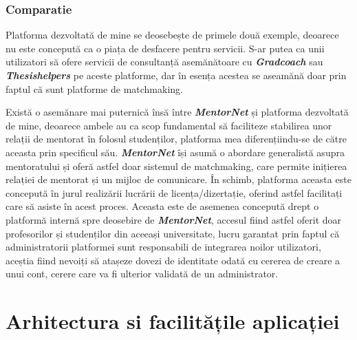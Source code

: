 \documentclass[12pt,a4paper,hidelinks]{report}
\theoremstyle{definition}
\theoremstyle{remark}
\begin{document}
\subsection{Comparatie}
Platforma dezvoltată de mine se deosebește de primele două exemple, deoarece nu este concepută ca o piața de desfacere pentru servicii. S-ar putea ca unii utilizatori să ofere servicii de consultanță asemănătoare cu \textbf{\textit{Gradcoach}} sau \textbf{\textit{Thesishelpers}} pe aceste platforme, dar în esența acestea se aseamănă doar prin faptul că sunt platforme de matchmaking.

Există o asemănare mai puternică însă între \textbf{\textit{MentorNet}} și platforma dezvoltată de mine, deoarece ambele au ca scop fundamental să faciliteze stabilirea unor relații de mentorat în folosul studenților, platforma mea diferențiindu-se de către aceasta prin specificul său. \textbf{\textit{MentorNet}} își asumă o abordare generalistă asupra mentoratului și oferă astfel doar sistemul de matchmaking, care permite inițierea relației de mentorat și un mijloc de comunicare. În schimb, platforma aceasta este concepută în jurul realizării lucrării de licența/dizertație, oferind astfel facilitați care să asiste în acest proces. Aceasta este de asemenea concepută drept o platformă internă spre deosebire de \textbf{\textit{MentorNet}}, accesul fiind astfel oferit doar profesorilor și studenților din aceeași universitate, lucru garantat prin faptul că administratorii platformei sunt responsabili de integrarea noilor utilizatori, aceștia fiind nevoiți să atașeze dovezi de identitate odată cu cererea de creare a unui cont, cerere care va fi ulterior validată de un administrator.
\chapter{Arhitectura si facilitățile aplicației}
\end{document}
